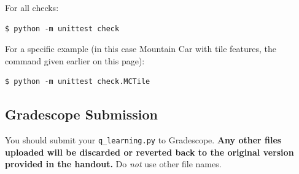 \documentclass[11pt,addpoints,answers]{exam}
\begin{document}
For all checks:
\begin{lstlisting}[language=Shell]
$ python -m unittest check
\end{lstlisting}

For a specific example (in this case Mountain Car with tile features, the command given earlier on this page):
\begin{lstlisting}[language=Shell]
$ python -m unittest check.MCTile
\end{lstlisting}

\subsection{Gradescope Submission}

You should submit your \texttt{q\_learning.py} to Gradescope.
\textbf{Any other files uploaded will be discarded or reverted back to the original version provided in the handout.}
Do \textit{not} use other file names.    
\end{document}
